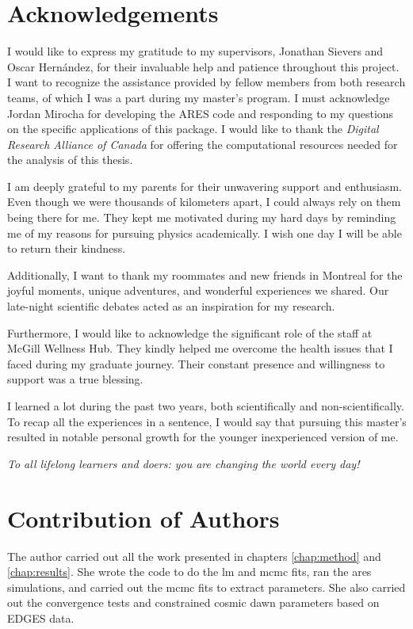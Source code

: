 \documentclass[12pt, TexShade, letterpaper]{report}
\begin{document}
\chapter*{Acknowledgements}
	\label{chap:acknowledgments}
I would like to express my gratitude to my supervisors, Jonathan Sievers and Oscar Hernández, for their invaluable help and patience throughout this project. I want to recognize the assistance provided by fellow members from both research teams, of which I was a part during my master's program. I must acknowledge Jordan Mirocha for developing the ARES code and responding to my questions on the specific applications of this package. I would like to thank the \emph{Digital Research Alliance of Canada} for offering the computational resources needed for the analysis of this thesis.\par
I am deeply grateful to my parents for their unwavering support and enthusiasm. Even though we were thousands of kilometers apart, I could always rely on them being there for me. They kept me motivated during my hard days by reminding me of my reasons for pursuing physics academically. I wish one day I will be able to return their kindness.\par
Additionally, I want to thank my roommates and new friends in Montreal for the joyful moments, unique adventures, and wonderful experiences we shared. Our late-night scientific debates acted as an inspiration for my research.\par
Furthermore, I would like to acknowledge the significant role of the staff at McGill Wellness Hub. They kindly helped me overcome the health issues that I faced during my graduate journey. Their constant presence and willingness to support was a true blessing.\par
I learned a lot during the past two years, both scientifically and non-scientifically. To recap all the experiences in a sentence, I would say that pursuing this master's resulted in notable personal growth for the younger inexperienced version of me.\par

\emph{To all lifelong learners and doers: you are changing the world every day!}
 \chapter*{Contribution of Authors}
	\label{chap:contribution}
The author carried out all the work presented in chapters \ref{chap:method} and \ref{chap:results}. She wrote the code to do the \gls{lm} and \gls{mcmc} fits, ran the \gls{ares} simulations, and carried out the \gls{mcmc} fits to extract parameters.  She also carried out the convergence tests and constrained cosmic dawn parameters based on EDGES data.\par
 
\end{document}
